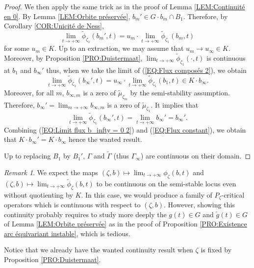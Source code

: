 \documentclass{article}
\theoremstyle{remark}
\newtheorem*{remark}{Remark}
\theoremstyle{definition}
\begin{document}
\begin{proof}
We then apply the same trick as in the proof of Lemma \ref{LEM:Continuité en 0}. By Lemma \ref{LEM:Orbite préservée}, $b_m' \in G \cdot b_m \cap B_1$. Therefore, by Corollary \ref{COR:Unicité de Ness},
\begin{equation}\label{EQ:Flux composés 2}
\lim_{t \rightarrow +\infty} \tilde{\phi}_{\zeta_1}(b_m',t) = u_m \cdot \lim_{t \rightarrow +\infty} \tilde{\phi}_{\zeta_1}(b_m,t)
\end{equation}
for some $u_m \in K$. Up to an extraction, we may assume that $u_m \rightarrow u_\infty \in K$. Moreover, by Proposition \ref{PRO:Duistermaat}, $\lim_{t \rightarrow +\infty} \tilde{\phi}_{\zeta_1}(\cdot,t)$ is continuous at $b_1$ and $b_\infty'$ thus, when we take the limit of (\ref{EQ:Flux composés 2}), we obtain
\begin{equation}\label{EQ:Limit flux b_infty = 0 2}
\lim_{t \rightarrow +\infty} \tilde{\phi}_{\zeta_1}(b_\infty',t) = u_\infty \cdot \lim_{t \rightarrow +\infty} \tilde{\phi}_{\zeta_1}(b_1,t) \in K \cdot b_\infty.
\end{equation}
Moreover, for all $m$, $b_{\infty,m}$ is a zero of $\tilde{\mu}_{\zeta_m}$ by the semi-stability assumption. Therefore, $b_\infty' = \lim_{m \rightarrow +\infty} b_{\infty,m}$ is a zero of $\tilde{\mu}_{\zeta_1}$. It implies that
\begin{equation}\label{EQ:Flux constant}
    \lim_{t \rightarrow +\infty} \tilde{\phi}_{\zeta_1}(b_\infty',t) = \lim_{t \rightarrow +\infty} b_\infty' = b_\infty'.
\end{equation}
Combining (\ref{EQ:Limit flux b_infty = 0 2}) and (\ref{EQ:Flux constant}), we obtain that $K \cdot b_\infty' = K \cdot b_\infty$ hence the wanted result.

Up to replacing $B_1$ by $B_1'$, $\Gamma$ and $\tilde{\Gamma}$ (thus $\Gamma_\infty$) are continuous on their domain.
\end{proof}

\begin{remark}
    We expect the maps $(\zeta,b) \mapsto \lim_{t \rightarrow +\infty} \phi_\zeta(b,t)$ and $(\zeta,b) \mapsto \lim_{t \rightarrow +\infty} \tilde{\phi}_\zeta(b,t)$ to be continuous on the semi-stable locus even without quotienting by $K$. In this case, we would produce a family of $P_\zeta$-critical operators which is continuous with respect to $(\zeta,b)$. However, showing this continuity probably requires to study more deeply the $g(t) \in G$ and $\tilde{g}(t) \in G$ of Lemma \ref{LEM:Orbite préservée} as in the proof of Proposition \ref{PRO:Existence arc équivariant instable}, which is tedious.

    Notice that we already have the wanted continuity result when $\zeta$ is fixed by Proposition \ref{PRO:Duistermaat}.
\end{remark}
\end{document}
